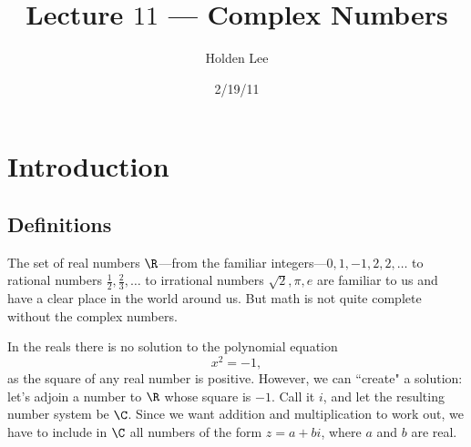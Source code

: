 
\pagestyle{fancy}





%
%

\title{Lecture $11$ --- Complex Numbers}%
\author{Holden Lee}
\date{2/19/11}%
\maketitle
\thispagestyle{empty}
\section{Introduction}
\subsection{Definitions}
The set of real numbers $\R$---from the familiar integers---$0,1,-1,2,2,\ldots$ to rational numbers $\frac 12,\frac23,\ldots$ to irrational numbers $\sqrt{2},\pi,e$ are familiar to us and have a clear place in the world around us. But math is not quite complete without the complex numbers.

In the reals there is no solution to the polynomial equation
\[
x^2=-1,
\]
as the square of any real number is positive. However, we can ``create" a solution: let's adjoin a number to $\R$ whose square is $-1$. Call it $i$, and let the resulting number system be $\C$. Since we want addition and multiplication to work out, we have to include in $\C$ all numbers of the form $z=a+bi$, where $a$ and $b$ are real.


